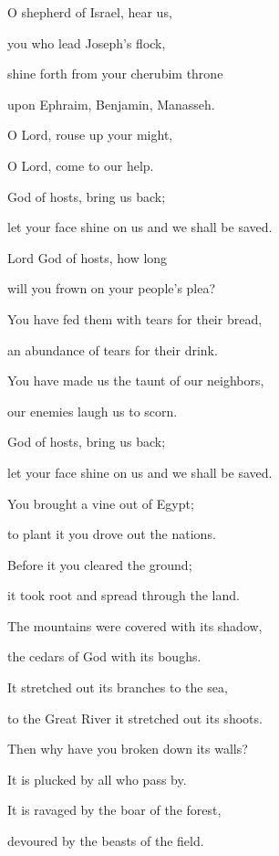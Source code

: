 \noindent O shepherd of Israel, hear us,~\GreStar{}~\nopagebreak

you who lead Joseph’s flock,

\noindent shine forth from your cherubim throne~\GreStar{}~\nopagebreak

upon Ephraim, Benjamin, Manasseh.

\noindent O Lord, rouse up your might,~\GreStar{}~\nopagebreak

O Lord, come to our help.

\noindent God of hosts, bring us back;~\GreStar{}~\nopagebreak

let your face shine on us and we shall be saved.

\noindent Lord God of hosts, how long~\GreStar{}~\nopagebreak

will you frown on your people’s plea?

\noindent You have fed them with tears for their bread,~\GreStar{}~\nopagebreak

an abundance of tears for their drink.

\noindent You have made us the taunt of our neighbors,~\GreStar{}~\nopagebreak

our enemies laugh us to scorn.

\noindent God of hosts, bring us back;~\GreStar{}~\nopagebreak

let your face shine on us and we shall be saved.

\noindent You brought a vine out of Egypt;~\GreStar{}~\nopagebreak

to plant it you drove out the nations.

\noindent Before it you cleared the ground;~\GreStar{}~\nopagebreak

it took root and spread through the land.

\noindent The mountains were covered with its shadow,~\GreStar{}~\nopagebreak

the cedars of God with its boughs.

\noindent It stretched out its branches to the sea,~\GreStar{}~\nopagebreak

to the Great River it stretched out its shoots.

\noindent Then why have you broken down its walls?~\GreStar{}~\nopagebreak

It is plucked by all who pass by.

\noindent It is ravaged by the boar of the forest,~\GreStar{}~\nopagebreak

devoured by the beasts of the field.

